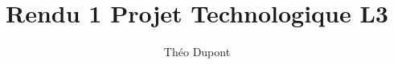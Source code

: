 \documentclass[12pt]{article}
\begin{document}
\title{Rendu 1 Projet Technologique L3}
\author{Théo Dupont}
\maketitle
\end{document}
